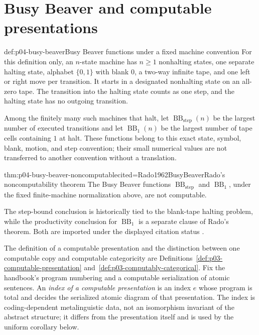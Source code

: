 \section{Busy Beaver and computable presentations}
\label{sec:p04-busy-beaver-structures}

\begin{hbdefinition}{def:p04-busy-beaver}{Busy Beaver functions under a fixed machine convention}
For this definition only, an \(n\)-state machine has \(n\geq1\) nonhalting
states, one separate halting state, alphabet \(\{0,1\}\) with blank \(0\), a
two-way infinite tape, and one left or right move per transition.  It starts
in a designated nonhalting state on an all-zero tape.  The transition into
the halting state counts as one step, and the halting state has no outgoing
transition.

Among the finitely many such machines that halt, let
\(\operatorname{BB}_{\mathrm{step}}(n)\) be the largest number of executed
transitions and let \(\operatorname{BB}_{1}(n)\) be the largest number of
tape cells containing \(1\) at halt.  These functions belong to this exact
state, symbol, blank, motion, and step convention; their small numerical
values are not transferred to another convention without a translation.
\end{hbdefinition}

\begin{hbtheorem}{thm:p04-busy-beaver-noncomputable}{cited=Rado1962BusyBeaver}{Rado's noncomputability theorem}
The Busy Beaver functions \(\operatorname{BB}_{\mathrm{step}}\) and
\(\operatorname{BB}_{1}\), under the fixed finite-machine normalization
above, are not computable.
\end{hbtheorem}

The step-bound conclusion is historically tied to the blank-tape halting
problem, while the productivity conclusion for
\(\operatorname{BB}_{1}\) is a separate clause of Rado's theorem.  Both are
imported under the displayed citation status \cite{Rado1962BusyBeaver}.

The definition of a computable presentation and the distinction between one
computable copy and computable categoricity are
Definitions~\ref{def:p03-computable-presentation}
and~\ref{def:p03-computably-categorical}.  Fix the handbook's program
numbering and a computable serialization of atomic sentences.  An
\emph{index of a computable presentation} is an index \(e\) whose program is
total and decides the serialized atomic diagram of that presentation.  The
index is coding-dependent metalinguistic data, not an isomorphism invariant of
the abstract structure; it differs from the presentation itself and is used by
the uniform corollary below.

